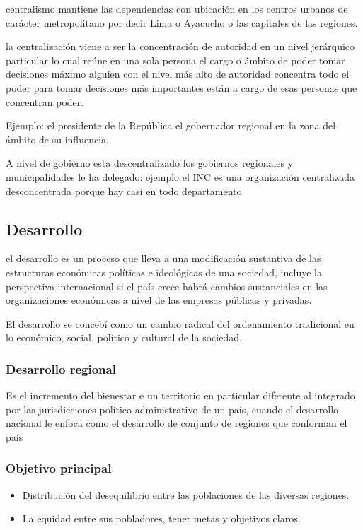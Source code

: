 \documentclass[
  a4paper,
]{article}
\providecommand{\tightlist}{%
  \setlength{\itemsep}{0pt}\setlength{\parskip}{0pt}}\usepackage{longtable,booktabs,array}
\begin{document}
centralismo mantiene las dependencias con ubicación en los centros
urbanos de carácter metropolitano por decir Lima o Ayacucho o las
capitales de las regiones.

la centralización viene a ser la concentración de autoridad en un nivel
jerárquico particular lo cual reúne en una sola persona el cargo o
ámbito de poder tomar decisiones máximo alguien con el nivel más alto de
autoridad concentra todo el poder para tomar decisiones más importantes
están a cargo de esas personas que concentran poder.

Ejemplo: el presidente de la República el gobernador regional en la zona
del ámbito de su influencia.

A nivel de gobierno esta descentralizado los gobiernos regionales y
municipalidades le ha delegado: ejemplo el INC es una organización
centralizada desconcentrada porque hay casi en todo departamento.

\subsection{Desarrollo}\label{desarrollo}

el desarrollo es un proceso que lleva a una modificación sustantiva de
las estructuras económicas políticas e ideológicas de una sociedad,
incluye la perspectiva internacional si el país crece habrá cambios
sustanciales en las organizaciones económicas a nivel de las empresas
públicas y privadas.

El desarrollo se concebí como un cambio radical del ordenamiento
tradicional en lo económico, social, político y cultural de la sociedad.

\subsubsection{Desarrollo regional}\label{desarrollo-regional}

Es el incremento del bienestar e un territorio en particular diferente
al integrado por las jurisdicciones político administrativo de un país,
cuando el desarrollo nacional le enfoca como el desarrollo de conjunto
de regiones que conforman el país

\subsubsection{Objetivo principal}\label{objetivo-principal}

\begin{itemize}
\tightlist
\item
  Distribución del desequilibrio entre las poblaciones de las diversas
  regiones.
\item
  La equidad entre sus pobladores, tener metas y objetivos claros.
\end{itemize}
\end{document}
